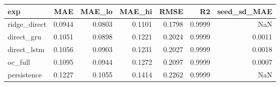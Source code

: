 \begin{tabular}{lrrrrrr}
\toprule
exp & MAE & MAE\_lo & MAE\_hi & RMSE & R2 & seed\_sd\_MAE \\
\midrule
ridge\_direct & 0.0944 & 0.0803 & 0.1101 & 0.1798 & 0.9999 & NaN \\
direct\_gru & 0.1051 & 0.0898 & 0.1221 & 0.2024 & 0.9999 & 0.0011 \\
direct\_lstm & 0.1056 & 0.0903 & 0.1231 & 0.2027 & 0.9999 & 0.0018 \\
oc\_full & 0.1095 & 0.0944 & 0.1272 & 0.2097 & 0.9999 & 0.0007 \\
persistence & 0.1227 & 0.1055 & 0.1414 & 0.2262 & 0.9999 & NaN \\
\bottomrule
\end{tabular}

